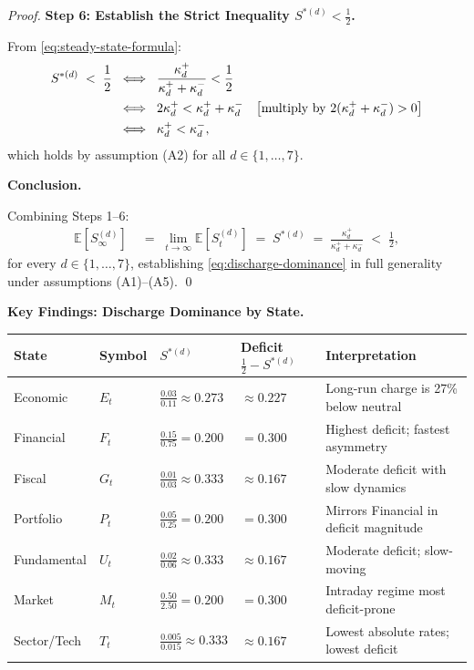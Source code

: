 \documentclass[12pt,openany]{book}
\newcommand{\calE}{\mathcal{E}}
\newcommand{\calF}{\mathcal{F}}
\newcommand{\calG}{\mathcal{G}}
\newcommand{\calP}{\mathcal{P}}
\newcommand{\calU}{\mathcal{U}}
\newcommand{\calM}{\mathcal{M}}
\newcommand{\calT}{\mathcal{T}}
\numberwithin{equation}{chapter}
\theoremstyle{plain}
\theoremstyle{definition}
\theoremstyle{remark}
\def\mathcal#1{#1}%
\begin{document}
\begin{proof}
\medskip
\noindent\textbf{Step 6: Establish the Strict Inequality
$\mathcal{S}^{*(d)} < \tfrac{1}{2}$.}

\noindent
From \eqref{eq:steady-state-formula}:
\begin{align}
  \mathcal{S}^{*(d)} \;<\; \frac{1}{2}
  &\;\iff\;
  \frac{\kappa_d^{+}}{\kappa_d^{+}+\kappa_d^{-}}
  < \frac{1}{2} \notag \\
  &\;\iff\;
  2\kappa_d^{+}
  < \kappa_d^{+} + \kappa_d^{-}
  \quad\bigl[\text{multiply by }
  2(\kappa_d^{+}+\kappa_d^{-}) > 0\bigr] \notag \\
  &\;\iff\;
  \kappa_d^{+} < \kappa_d^{-},
  \label{eq:ineq-chain}
\end{align}
which holds by assumption (A2) for all $d \in \{1,\ldots,7\}$.
\checkmark

\medskip
\noindent\textbf{Conclusion.}

\noindent
Combining Steps 1--6:
\begin{align}
  \mathbb{E}\!\left[\mathcal{S}_\infty^{(d)}\right]
  &\;=\;
  \lim_{t\to\infty}\mathbb{E}\!\left[\mathcal{S}_t^{(d)}\right]
  \;=\;
  \mathcal{S}^{*(d)}
  \;=\;
  \frac{\kappa_d^{+}}{\kappa_d^{+}+\kappa_d^{-}}
  \;<\; \frac{1}{2},
  \label{eq:conclusion-dd}
\end{align}
for every $d \in \{1,\ldots,7\}$, establishing
\eqref{eq:discharge-dominance} in full generality under
assumptions (A1)--(A5). \qed
\end{proof}

\noindent\textbf{Key Findings: Discharge Dominance by State.}

\medskip
\begin{center}
\begin{tabularx}{\textwidth}{@{} l l X X X @{}}
\toprule
\textbf{State} &
\textbf{Symbol} &
\textbf{$\mathcal{S}^{*(d)}$} &
\textbf{Deficit $\tfrac{1}{2} - \mathcal{S}^{*(d)}$} &
\textbf{Interpretation} \\
\midrule
Economic &
$\calE_t$ &
$\tfrac{0.03}{0.11} \approx 0.273$ &
$\approx 0.227$ &
Long-run charge is 27\% below neutral \\
Financial &
$\calF_t$ &
$\tfrac{0.15}{0.75} = 0.200$ &
$= 0.300$ &
Highest deficit; fastest asymmetry \\
Fiscal &
$\calG_t$ &
$\tfrac{0.01}{0.03} \approx 0.333$ &
$\approx 0.167$ &
Moderate deficit with slow dynamics \\
Portfolio &
$\calP_t$ &
$\tfrac{0.05}{0.25} = 0.200$ &
$= 0.300$ &
Mirrors Financial in deficit magnitude \\
Fundamental &
$\calU_t$ &
$\tfrac{0.02}{0.06} \approx 0.333$ &
$\approx 0.167$ &
Moderate deficit; slow-moving \\
Market &
$\calM_t$ &
$\tfrac{0.50}{2.50} = 0.200$ &
$= 0.300$ &
Intraday regime most deficit-prone \\
Sector/Tech &
$\calT_t$ &
$\tfrac{0.005}{0.015} \approx 0.333$ &
$\approx 0.167$ &
Lowest absolute rates; lowest deficit \\
\bottomrule
\end{tabularx}
\end{center}
\end{document}
